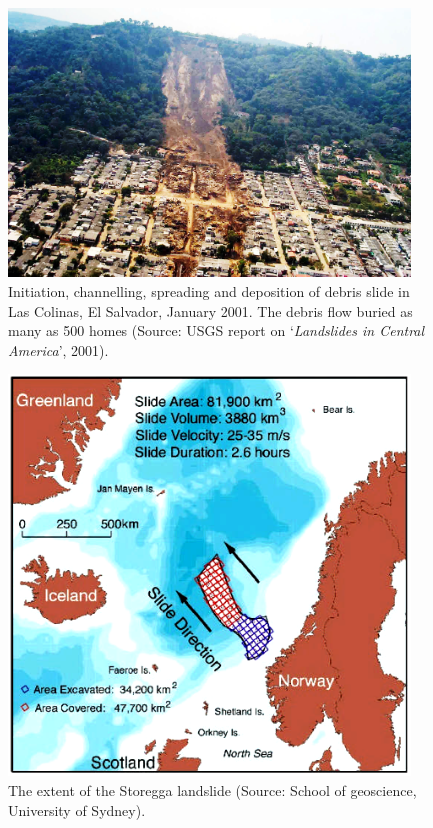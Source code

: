 \begin{figure}[tbhp]
\centering
\includegraphics[width=0.95\textwidth]{Debrisflow}
\caption[Debris slide in Las Colinas, El Salvador, January 2001]{Initiation, 
channelling, spreading and deposition of debris slide in Las Colinas, El 
Salvador, January 2001. The debris flow buried as many as 500 homes (Source: 
USGS report on `\textit{Landslides in Central America}', 2001).}
\label{fig:debris}
\end{figure}

\begin{figure}[tbhp]
\centering
\includegraphics[width=0.95\textwidth]{Storegga}
\caption[The extent of the Storegga landslide]{The extent of the Storegga 
landslide (Source: School of geoscience, University of Sydney).}
\label{fig:Landslide}
\end{figure}

